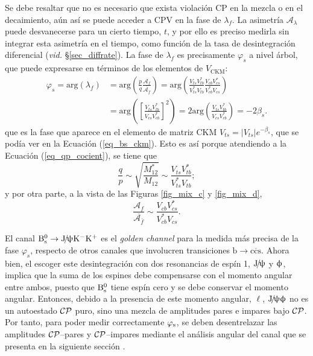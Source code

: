 Se debe resaltar que no es necesario que exista violación CP en la mezcla o en el decaimiento, aún así se puede acceder a CPV en la fase de $\lambda_f$. La asimetría $\mathscr{A}_{\lambda}$ puede desvanecerse para un cierto tiempo, $t$, y por ello es preciso medirla sin integrar esta asimetría en el tiempo, como función de la tasa de desintegración diferencial (\emph{vid.} \S \ref{sec_diffrate}). La fase de $\lambda_f$ es precisamente $\varphi_s$ \color{vero} a nivel árbol, \color{norm} que puede expresarse en términos de los elementos de $V_{\text{CKM}}$:
\begin{equation}
\begin{split}
  \varphi_s = \text{arg} (\lambda_f) & =  \text{arg}\left(\frac{p}{q}  \frac{\mathcal{A}_f}{\overline{\mathcal{A}_{\bar{f}}}}\right) =   \text{arg}\left(\frac{V_{ts}V_{tb}^*}{V_{ts}^*V_{tb}} \frac{V_{cb}V_{cs}^*}{V_{cb}^*V_{cs}} \right) \\ &=   \text{arg} \left(  \left[ \frac{V_{ts} V_{tb}^*}{V_{cs} V_{cb}^*}  \right]^2  \right) = 2 \text{arg} \left(   \frac{V_{ts} V_{tb}^*}{V_{cs} V_{cb}^*}    \right)  =  - 2\beta_s.
\end{split}
\end{equation}
que es la fase que aparece en el elemento de matriz \textsc{CKM} $V_{ts} = |V_{ts}| e^{- \beta_s}$, que se podía ver en la Ecuación (\ref{eq_bs_ckm}).
%
Esto es así porque atendiendo a la Ecuación (\ref{eq_qp_cocient}), se tiene que
\[\frac{q}{p} \sim \sqrt{\frac {M_{12}^*} {M_{12}} } \sim \frac{V_{ts}V_{tb}^*}{V_{ts}^*V_{tb}}; \]
y por otra parte, a la vista de las Figuras \ref{fig_mix_c} y \ref{fig_mix_d},
\[\frac{\mathcal{A}_f}{\overline{\mathcal{A}_{\bar{f}}}} \sim \frac{V_{cb}V_{cs}^*}{V_{cb}^*V_{cs}}.\]



El canal $\text{B}{}_{\text{s}}^{0} \rightarrow \text{J}\!/\!\uppsi \text{K}{}^{-} \text{K}{}^{+}$ es el \emph{golden channel} para la medida más precisa de la fase $\varphi_s$, respecto de otros canales que involucren transiciones $\mathrm{b \rightarrow c\overline{c}s}$. Ahora bien, el escoger este desintegración con dos resonancias de \color{vero} espín 1, \color{norm} $\text{J}\!/\!\uppsi$ y $\upphi$, implica que la suma de los espines debe compensarse con el momento angular entre ambos, puesto que $\text{B}{}_{\text{s}}^{0}$ tiene espín cero y se debe conservar el momento angular. Entonces, debido a la presencia de este momento angular, $\ell$, $\text{J}\!/\!\uppsi \upphi$ no es un autoestado $\mathcal{CP}$ puro, sino una mezcla de amplitudes pares e impares bajo $\mathcal{CP}$. Por tanto, para poder medir correctamente $\varphi_{\text{s}}$, se deben desentrelazar las amplitudes $\mathcal{CP}$--pares y $\mathcal{CP}$--impares mediante el análisis angular del canal que se presenta en la siguiente sección \cite{paperPhis}.



